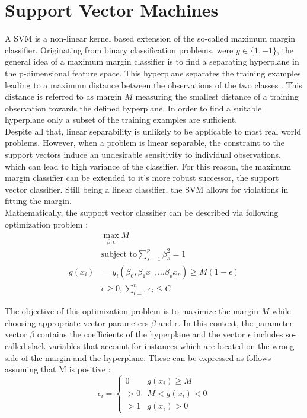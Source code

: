 \section{Support Vector Machines}

A SVM is a non-linear kernel based extension of the so-called maximum margin classifier. Originating from binary classification problems, were $y \in \{1, -1\}$, the general idea of a maximum margin classifier is to find a separating hyperplane in the p-dimensional feature space. This hyperplane separates the training examples leading to a maximum distance between the observations of the two classes \cite{James:2014:ISL:2517747}. This distance is referred to as margin $M$ measuring the smallest distance of a training observation towards the defined hyperplane. In order to find a suitable hyperplane only a subset of the training examples are sufficient.\\

Despite all that, linear separability is unlikely to be applicable to most real world problems. However, when a problem is linear separable, the constraint to the support vectors induce an undesirable sensitivity to individual observations, which can lead to high variance of the classifier. For this reason, the maximum margin classifier can be extended to it's more robust successor, the support vector classifier. Still being a linear classifier, the SVM allows for violations in fitting the margin. \\

Mathematically, the support vector classifier can be described via following optimization problem \cite{James:2014:ISL:2517747}:
\begin{eqnarray}
  & \max_{\beta, \epsilon} M \\
  & \textrm{subject to} \sum_{s=1}^{p} \beta^2_s = 1 \\
  g(x_{i}) &= y_i(\beta_0, \beta_1 x_1, \dots \beta_p x_p) \geq M(1 - \epsilon) \\
  & \epsilon \geq 0, \sum_{i=1}^n \epsilon_i \leq C
\end{eqnarray}

The objective of this optimization problem is to maximize the margin $M$ while choosing appropriate vector parameters $\beta$ and $\epsilon$. In this context, the parameter vector $\beta$ contains the coefficients of the hyperplane and the vector $\epsilon$ includes so-called slack variables that account for instances which are located on the wrong side of the margin and the hyperplane. These can be expressed as follows assuming that M is positive \cite{James:2014:ISL:2517747}:
\begin{equation}
  \epsilon_i =
  \begin{cases}
    0 & g(x_i) \geq M \\
    > 0 & M < g(x_i) < 0 \\
    > 1 & g(x_i) > 0 
  \end{cases}
\end{equation}

